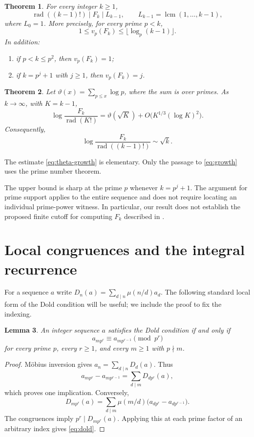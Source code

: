 \documentclass[11pt]{article}
\newtheorem{theorem}{Theorem}
\newtheorem{lemma}[theorem]{Lemma}
\theoremstyle{remark}
\DeclareMathOperator{\rad}{rad}
\DeclareMathOperator{\lcm}{lcm}
\begin{document}
\begin{theorem}\label{thm:main}
For every integer $k\geq1$,
\begin{equation}\label{eq:bounds}
 \rad((k-1)!)\mid F_k\mid L_{k-1},
 \qquad L_{k-1}=\lcm(1,\ldots,k-1),
\end{equation}
where $L_0=1$. More precisely, for every prime $p<k$,
\[
 1\leq v_p(F_k)\leq\lfloor\log_p(k-1)\rfloor.
\]
In addition:
\begin{enumerate}
\item if $p<k\leq p^2$, then $v_p(F_k)=1$;
\item if $k=p^j+1$ with $j\geq1$, then $v_p(F_k)=j$.
\end{enumerate}
\end{theorem}

\begin{theorem}\label{thm:growth}
Let $\vartheta(x)=\sum_{p\leq x}\log p$, where the sum is over primes.
As $k\to\infty$, with $K=k-1$,
\begin{equation}\label{eq:theta-growth}
 \log\frac{F_k}{\rad(K!)}
 =\vartheta(\sqrt K)+O\bigl(K^{1/3}(\log K)^2\bigr).
\end{equation}
Consequently,
\begin{equation}\label{eq:growth}
 \log\frac{F_k}{\rad((k-1)!)}\sim\sqrt{k}.
\end{equation}
\end{theorem}

The estimate \eqref{eq:theta-growth} is elementary. Only the passage to
\eqref{eq:growth} uses the prime number theorem.

The upper bound is sharp at the prime $p$ whenever $k=p^j+1$.
The argument for prime support applies to the entire sequence and does not
require locating an individual prime-power witness. In particular, our result
does not establish the proposed finite cutoff for computing $F_k$ described
in \cite[Section~4.5]{BGW}.

\section{Local congruences and the integral recurrence}
For a sequence $a$ write $D_n(a)=\sum_{d\mid n}\mu(n/d)a_d$.
The following standard local form of the Dold condition will be useful; we
include the proof to fix the indexing.

\begin{lemma}\label{lem:local}
An integer sequence $a$ satisfies the Dold condition if and only if
\begin{equation}\label{eq:local}
 a_{mp^r}\equiv a_{mp^{r-1}}\pmod {p^r}
\end{equation}
for every prime $p$, every $r\geq1$, and every $m\geq1$ with $p\nmid m$.
\end{lemma}
\begin{proof}
M\"obius inversion gives $a_n=\sum_{d\mid n}D_d(a)$. Thus
\[
 a_{mp^r}-a_{mp^{r-1}}=\sum_{d\mid m}D_{dp^r}(a),
\]
which proves one implication. Conversely,
\[
 D_{mp^r}(a)=\sum_{d\mid m}\mu(m/d)
       \bigl(a_{dp^r}-a_{dp^{r-1}}\bigr).
\]
The congruences imply $p^r\mid D_{mp^r}(a)$. Applying this at each prime
factor of an arbitrary index gives \eqref{eq:dold}.
\end{proof}
\end{document}
